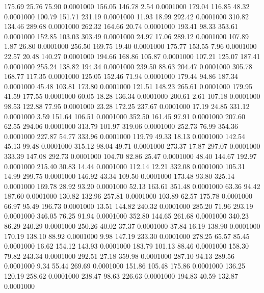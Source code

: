  175.69   25.76   75.90   0.0001000
 156.05  146.78    2.54   0.0001000
 179.04  116.85   48.32   0.0001000
 100.79  151.71  231.19   0.0001000
  11.93   18.99  292.42   0.0001000
 310.82  134.46  289.68   0.0001000
 262.32  164.66   20.74   0.0001000
 193.41   98.33  353.61   0.0001000
 152.85  103.03  303.49   0.0001000
  24.97   17.06  289.12   0.0001000
 107.89    1.87   26.80   0.0001000
 256.50  169.75   19.40   0.0001000
 175.77  153.55    7.96   0.0001000
  22.57   20.48  140.27   0.0001000
 194.66  168.86  105.87   0.0001000
 107.21  125.07  187.41   0.0001000
 255.24  138.82  194.34   0.0001000
 239.50   88.63  204.47   0.0001000
 305.78  168.77  117.35   0.0001000
 125.05  152.46   71.94   0.0001000
 179.44   94.86  187.34   0.0001000
  45.48  103.81  173.80   0.0001000
 121.51  148.23  265.61   0.0001000
 179.95   41.59  177.55   0.0001000
  60.05   18.28  136.34   0.0001000
 200.61    2.61  107.18   0.0001000
  98.53  122.88   77.95   0.0001000
  23.28  172.25  237.67   0.0001000
  17.19   24.85  331.12   0.0001000
   3.59  151.64  106.51   0.0001000
 352.50  161.45   97.91   0.0001000
 207.60   62.55  294.06   0.0001000
 313.79  101.97  319.06   0.0001000
 252.73   76.99  354.36   0.0001000
 227.87   54.77  333.96   0.0001000
 119.79   49.33   18.13   0.0001000
 142.54   45.13   99.48   0.0001000
 315.12   98.04   49.71   0.0001000
 273.37   17.87  297.07   0.0001000
 333.39  147.08  292.73   0.0001000
 104.70   82.86   25.47   0.0001000
  48.40  144.67  192.97   0.0001000
 215.40   30.83   14.44   0.0001000
 112.14   12.21  332.08   0.0001000
 105.31   14.99  299.75   0.0001000
 146.92   43.34  109.50   0.0001000
 173.48   93.80  325.14   0.0001000
 169.78   28.92   93.20   0.0001000
  52.13  163.61  351.48   0.0001000
  63.36   94.42  187.60   0.0001000
 130.82  132.96  257.81   0.0001000
 103.89   62.57  175.78   0.0001000
  66.97   95.49  196.73   0.0001000
  13.51  144.82  240.32   0.0001000
 285.20   71.96  293.19   0.0001000
 346.05   76.25   91.94   0.0001000
 352.80  144.65  261.68   0.0001000
 340.23   86.29  240.29   0.0001000
 250.26   40.02   37.37   0.0001000
  37.84   16.19  138.90   0.0001000
 170.19  138.10   88.92   0.0001000
   9.98  147.19  233.30   0.0001000
 278.25   65.57   85.45   0.0001000
  16.62  154.12  143.93   0.0001000
 183.79  101.13   88.46   0.0001000
 158.30   79.82  243.34   0.0001000
 292.51   27.18  359.98   0.0001000
 287.10   94.13  289.56   0.0001000
   9.34   55.44  269.69   0.0001000
 151.86  105.48  175.86   0.0001000
 136.25  120.19  258.62   0.0001000
 238.47   98.63  226.63   0.0001000
 194.83   40.59  132.87   0.0001000
